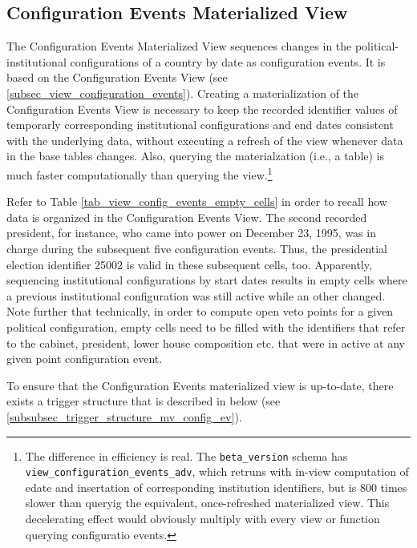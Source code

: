 \subsection{Configuration Events Materialized View}\label{subsec_mview_configuration_events}

The Configuration Events Materialized View sequences changes in the political-institutional configurations of a country by date as configuration events.
It is based on the  Configuration Events View (see \ref{subsec_view_configuration_events}).
Creating a materialization of the Configuration Events View is necessary to keep the recorded identifier values of temporarly corresponding institutional configurations and end dates consistent with the underlying data, without executing a refresh of the view whenever data in the base tables changes.
Also, querying the materialzation (i.e., a table) is much faster computationally than querying the view.\footnote{%
The difference in efficiency is real. 
The \texttt{beta\_version} schema has \texttt{view\_configuration\_events\_adv}, which retruns with in-view computation of edate and insertation of corresponding institution identifiers, but is 800 times slower than queryig the equivalent, once-refreshed materialized view. 
This decelerating effect would obviously multiply with every view or function querying configuratio events.} 

Refer to Table \ref{tab_view_config_events_empty_cells} in order to recall how data is organized in the Configuration Events View.
The second recorded president, for instance, who came into power on December 23, 1995, was in charge during the subsequent five configuration events. 
Thus, the presidential election identifier 25002 is valid in these subsequent cells, too.
Apparently, sequencing institutional configurations by start dates results in empty cells where a previous institutional configuration was still active while an other changed. 
Note further that technically, in order to compute open veto points for a given political configuration, empty cells need to be filled with the identifiers that refer to the cabinet, president, lower house composition etc. that were in active at any given point configuration event.

To ensure that the Configuration Events materialized view is up-to-date, there exists a trigger structure that is described in below (see \ref{subsubsec_trigger_structure_mv_config_ev}).

